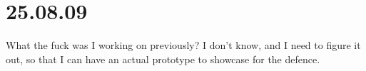 \section{25.08.09}

What the fuck was I working on previously? I don't know, and I need to figure
it out, so that I can have an actual prototype to showcase for the defence.
